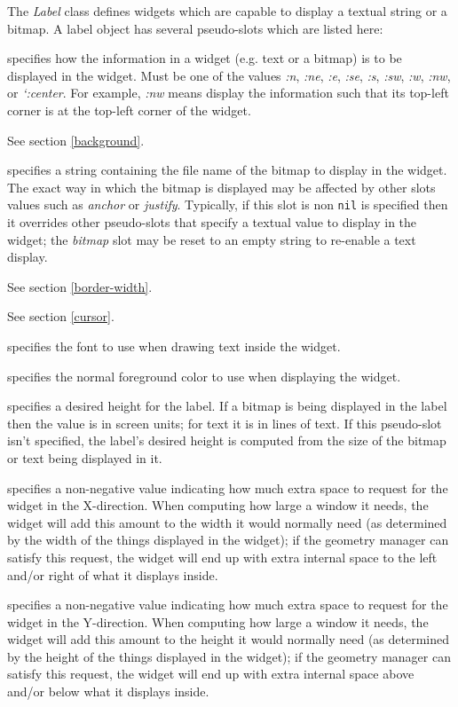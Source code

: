 The {\em Label} class defines widgets which are capable to display a textual
string or a bitmap. A label object has several pseudo-slots which are listed here:
\begin{ip}

\label{anchor}
specifies how the information in a widget (e.g. text or a bitmap) is to be
displayed in the widget. Must be one of the values {\em :n}, {\em :ne}, {\em
:e}, {\em :se}, {\em :s}, {\em :sw}, {\em :w}, {\em :nw}, or {\em `:center}.  For
example, {\em :nw} means display the information such that its top-left corner
is at the top-left corner of the widget.

See section \ref{background}.

\label{bitmap}
specifies a string containing the file name of the bitmap to display in the
widget. The exact way in which the bitmap is displayed may be affected by
other slots values such as {\em anchor} or {\em justify}.  Typically, if this
slot is non {\tt nil} is specified then it overrides other pseudo-slots that
specify a textual value to display in the widget; the {\em bitmap} slot may be
reset to an empty string to re-enable a text display.

See section \ref{border-width}.

See section \ref{cursor}.

\label{font}
specifies the font to use when drawing text inside the widget.

\label{foreground}
specifies the normal foreground color to use when displaying the widget.

specifies a desired height for the label.  If a bitmap is being displayed in
the label then the value is in screen units; for text it is in lines of text.
If this pseudo-slot isn't specified, the label's desired height is computed from
the size of the bitmap or text being displayed in it.

\label{pad-x}
specifies a non-negative value indicating how much extra space to request for
the widget in the X-direction. When computing how large a window it needs, the
widget will add this amount to the width it would normally need (as determined
by the width of the things displayed in the widget); if the geometry manager
can satisfy this request, the widget will end up with extra internal space to
the left and/or right of what it displays inside.

\label{pad-y}
specifies a non-negative value indicating how much extra space to request for
the widget in the Y-direction. When computing how large a window it needs,
the widget will add this amount to the height it would normally need (as
determined by the height of the things displayed in the widget); if the
geometry manager can satisfy this request, the widget will end up with extra
internal space above and/or below what it displays inside.


\end{ip}

